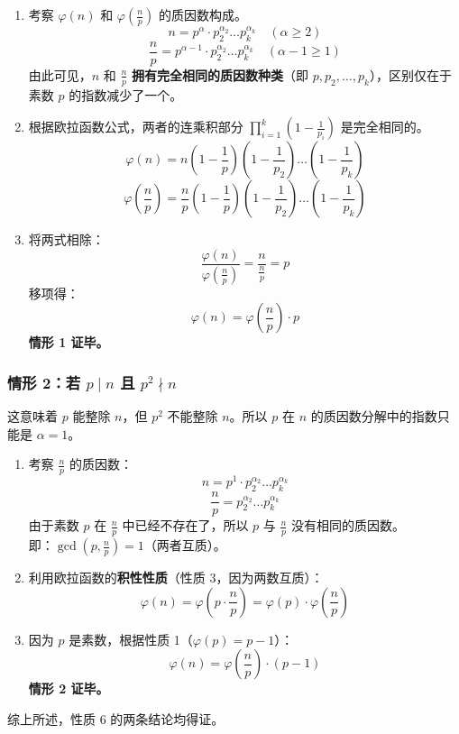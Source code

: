 \documentclass{article}
\begin{document}
\begin{enumerate}
    \item 考察 \(\varphi(n)\) 和 \(\varphi\left(\frac{n}{p}\right)\) 的质因数构成。
    \[
 n = p^{\alpha} \cdot p_2^{\alpha_2} \dots p_k^{\alpha_k} \quad (\alpha \ge 2) 
\]
    \[
 \frac{n}{p} = p^{\alpha-1} \cdot p_2^{\alpha_2} \dots p_k^{\alpha_k} \quad (\alpha-1 \ge 1) 
\]
    由此可见，\(n\) 和 \(\frac{n}{p}\) \textbf{拥有完全相同的质因数种类}（即 \(p, p_2, \dots, p_k\)），区别仅在于素数 \(p\) 的指数减少了一个。

    \item 根据欧拉函数公式，两者的连乘积部分 \(\prod_{i=1}^k \left(1 - \frac{1}{p_i}\right)\) 是完全相同的。
    \[
 \varphi(n) = n \left(1 - \frac{1}{p}\right) \left(1 - \frac{1}{p_2}\right) \dots \left(1 - \frac{1}{p_k}\right) 
\]
    \[
 \varphi\left(\frac{n}{p}\right) = \frac{n}{p} \left(1 - \frac{1}{p}\right) \left(1 - \frac{1}{p_2}\right) \dots \left(1 - \frac{1}{p_k}\right) 
\]

    \item 将两式相除：
    \[
 \frac{\varphi(n)}{\varphi\left(\frac{n}{p}\right)} = \frac{n}{\frac{n}{p}} = p 
\]
    移项得：
    \[
 \varphi(n) = \varphi\left(\frac{n}{p}\right) \cdot p 
\]
    \textbf{情形 1 证毕。}
\end{enumerate}

\subsubsection*{情形 2：若 \(p \mid n\) 且 \(p^2 \nmid n\)}
这意味着 \(p\) 能整除 \(n\)，但 \(p^2\) 不能整除 \(n\)。所以 \(p\) 在 \(n\) 的质因数分解中的指数只能是 \(\alpha = 1\)。

\begin{enumerate}
    \item 考察 \(\frac{n}{p}\) 的质因数：
    \[
 n = p^1 \cdot p_2^{\alpha_2} \dots p_k^{\alpha_k} 
\]
    \[
 \frac{n}{p} = p_2^{\alpha_2} \dots p_k^{\alpha_k} 
\]
    由于素数 \(p\) 在 \(\frac{n}{p}\) 中已经不存在了，所以 \(p\) 与 \(\frac{n}{p}\) 没有相同的质因数。\\
    即：\(\gcd\left(p, \frac{n}{p}\right) = 1\)（两者互质）。

    \item 利用欧拉函数的\textbf{积性性质}（性质 3，因为两数互质）：
    \[
 \varphi(n) = \varphi\left(p \cdot \frac{n}{p}\right) = \varphi(p) \cdot \varphi\left(\frac{n}{p}\right) 
\]

    \item 因为 \(p\) 是素数，根据性质 1（\(\varphi(p) = p - 1\)）：
    \[
 \varphi(n) = \varphi\left(\frac{n}{p}\right) \cdot (p - 1) 
\]
    \textbf{情形 2 证毕。}
\end{enumerate}

综上所述，性质 6 的两条结论均得证。
\end{document}
